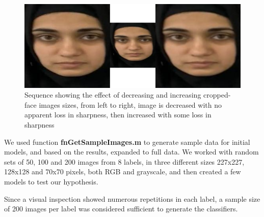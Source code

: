 \begin{figure}[ht]
 \centering 
 \includegraphics[width=\columnwidth]{images/decrease-increase.png}
 \caption{Sequence showing the effect of decreasing and increasing cropped-face images sizes, from left to right, image is decreased with no apparent loss in sharpness, then increased with some loss in sharpness}
 \label{fig:decrease_increase_example}
\end{figure}

We used function \textbf{fnGetSampleImages.m} to generate sample data for initial models, and based on the results, expanded to full data. We worked with random sets of 50, 100 and 200 images from 8 labels, in three different sizes 227x227, 128x128 and 70x70 pixels, both RGB and grayscale, and then created a few models to test our hypothesis.  

Since a visual inspection showed numerous repetitions in each label, a sample size of 200 images per label was considered sufficient to generate the classifiers.



